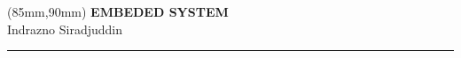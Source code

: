 \documentclass[12pt]{extreport}
\begin{document}



	\thispagestyle{empty}
	\begin{textblock*}{60mm}(85mm,90mm)
	\noindent
	{\sffamily\LARGE\bfseries EMBEDED SYSTEM}\\
	\noindent
	{\sffamily\small Indrazno Siradjuddin}\\
	{\color{dark-gray}\rule[5pt]{170pt}{3pt}}
	\end{textblock*}
	\null\newpage



	\thispagestyle{empty}
	\null\newpage

	\renewcommand\contentsname{Table of Contents} %
	\tableofcontents

	

	\thispagestyle{empty}
	\null\newpage

	\setcounter{page}{1}
	


	
	\ifodd\value{page}
	\thispagestyle{empty}
	\null\newpage
	\fi
\end{document}
